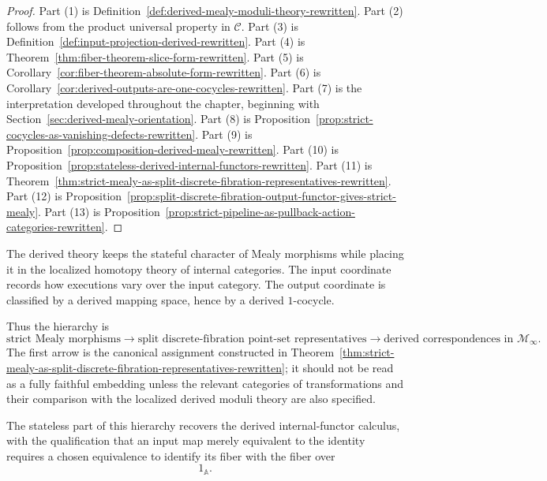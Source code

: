 \begin{proof}
Part (1) is Definition~\ref{def:derived-mealy-moduli-theory-rewritten}.
Part (2) follows from the product universal property in \(\mathcal C\).
Part (3) is Definition~\ref{def:input-projection-derived-rewritten}.
Part (4) is Theorem~\ref{thm:fiber-theorem-slice-form-rewritten}. Part
(5) is Corollary~\ref{cor:fiber-theorem-absolute-form-rewritten}. Part
(6) is Corollary~\ref{cor:derived-outputs-are-one-cocycles-rewritten}.
Part (7) is the interpretation developed throughout the chapter, beginning
with Section~\ref{sec:derived-mealy-orientation}. Part (8) is
Proposition~\ref{prop:strict-cocycles-as-vanishing-defects-rewritten}.
Part (9) is
Proposition~\ref{prop:composition-derived-mealy-rewritten}. Part (10) is
Proposition~\ref{prop:stateless-derived-internal-functors-rewritten}.
Part (11) is
Theorem~\ref{thm:strict-mealy-as-split-discrete-fibration-representatives-rewritten}.
Part (12) is
Proposition~\ref{prop:split-discrete-fibration-output-functor-gives-strict-mealy}.
Part (13) is
Proposition~\ref{prop:strict-pipeline-as-pullback-action-categories-rewritten}.
\end{proof}

\begin{remark}
\label{rem:derived-mealy-conceptual-summary-rewritten}
The derived theory keeps the stateful character of Mealy morphisms while
placing it in the localized homotopy theory of internal categories. The
input coordinate records how executions vary over the input category.
The output coordinate is classified by a derived mapping space, hence by
a derived \(1\)-cocycle.

Thus the hierarchy is
\[
\text{strict Mealy morphisms}
\longrightarrow
\text{split discrete-fibration point-set representatives}
\longrightarrow
\text{derived correspondences in }\mathcal M_\infty.
\]
The first arrow is the canonical assignment constructed in
Theorem~\ref{thm:strict-mealy-as-split-discrete-fibration-representatives-rewritten};
it should not be read as a fully faithful embedding unless the relevant
categories of transformations and their comparison with the localized
derived moduli theory are also specified.

The stateless part of this hierarchy recovers the derived
internal-functor calculus, with the qualification that an input map
merely equivalent to the identity requires a chosen equivalence to
identify its fiber with the fiber over
\[
1_{\mathbb A}.
\]
\end{remark}

